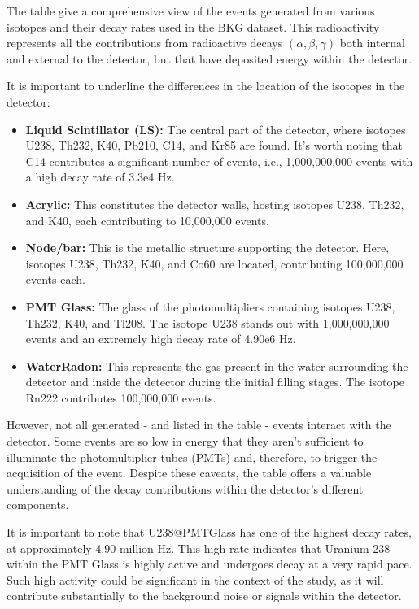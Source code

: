 The table give a comprehensive view of the events generated from various isotopes and their decay rates used in the BKG dataset. This radioactivity represents all the contributions from radioactive decays $(\alpha, \beta, \gamma)$ both internal and external to the detector, but that have deposited energy within the detector.

It is important to underline the differences in the location of the isotopes in the detector:

\begin{itemize}
	\item \textbf{Liquid Scintillator (LS):} The central part of the detector, where isotopes U238, Th232, K40, Pb210, C14, and Kr85 are found. It's worth noting that C14 contributes a significant number of events, i.e., 1,000,000,000 events with a high decay rate of 3.3e4 Hz.
	\item \textbf{Acrylic:} This constitutes the detector walls, hosting isotopes U238, Th232, and K40, each contributing to 10,000,000 events.
	\item \textbf{Node/bar:} This is the metallic structure supporting the detector. Here, isotopes U238, Th232, K40, and Co60 are located, contributing 100,000,000 events each.
	\item \textbf{PMT Glass:} The glass of the photomultipliers containing isotopes U238, Th232, K40, and Tl208. The isotope U238 stands out with 1,000,000,000 events and an extremely high decay rate of 4.90e6 Hz.
	\item \textbf{WaterRadon:} This represents the gas present in the water surrounding the detector and inside the detector during the initial filling stages. The isotope Rn222 contributes 100,000,000 events.
\end{itemize}

However, not all generated - and listed in the table - events interact with the detector. Some events are so low in energy that they aren't sufficient to illuminate the photomultiplier tubes (PMTs) and, therefore, to trigger the acquisition of the event. Despite these caveats, the table offers a valuable understanding of the decay contributions within the detector's different components.

It is important to note that U238@PMTGlass has one of the highest decay rates, at approximately 4.90 million Hz. This high rate indicates that Uranium-238 within the PMT Glass is highly active and undergoes decay at a very rapid pace. Such high activity could be significant in the context of the study, as it will contribute substantially to the background noise or signals within the detector.

